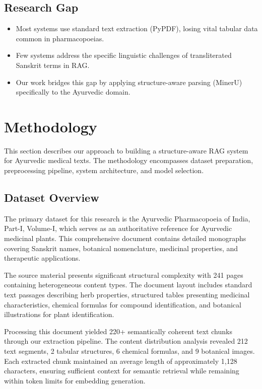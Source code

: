 \documentclass[conference]{IEEEtran}
\begin{document}
\subsection{Research Gap}
\begin{itemize}
    \item Most systems use standard text extraction (PyPDF), losing vital tabular data common in pharmacopoeias.
    \item Few systems address the specific linguistic challenges of transliterated Sanskrit terms in RAG.
    \item Our work bridges this gap by applying structure-aware parsing (MinerU) specifically to the Ayurvedic domain.
\end{itemize}

\section{Methodology}

This section describes our approach to building a structure-aware RAG system for Ayurvedic medical texts. The methodology encompasses dataset preparation, preprocessing pipeline, system architecture, and model selection.

\subsection{Dataset Overview}
The primary dataset for this research is the Ayurvedic Pharmacopoeia of India, Part-I, Volume-I, which serves as an authoritative reference for Ayurvedic medicinal plants. This comprehensive document contains detailed monographs covering Sanskrit names, botanical nomenclature, medicinal properties, and therapeutic applications.

The source material presents significant structural complexity with 241 pages containing heterogeneous content types. The document layout includes standard text passages describing herb properties, structured tables presenting medicinal characteristics, chemical formulas for compound identification, and botanical illustrations for plant identification.

Processing this document yielded 220+ semantically coherent text chunks through our extraction pipeline. The content distribution analysis revealed 212 text segments, 2 tabular structures, 6 chemical formulas, and 9 botanical images. Each extracted chunk maintained an average length of approximately 1,128 characters, ensuring sufficient context for semantic retrieval while remaining within token limits for embedding generation.
\end{document}
